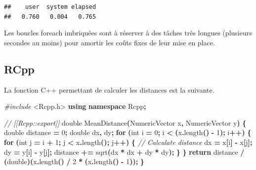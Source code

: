 \documentclass[
  12pt,
  french,
  a4paper,
  extrafontsizes,onecolumn,openright
  ]{memoir}
\newenvironment{Shaded}{\begin{snugshade}}{\end{snugshade}}
\newcommand{\CommentTok}[1]{\textcolor[rgb]{0.56,0.35,0.01}{\textit{#1}}}
\newcommand{\ControlFlowTok}[1]{\textcolor[rgb]{0.13,0.29,0.53}{\textbf{#1}}}
\newcommand{\DataTypeTok}[1]{\textcolor[rgb]{0.13,0.29,0.53}{#1}}
\newcommand{\DecValTok}[1]{\textcolor[rgb]{0.00,0.00,0.81}{#1}}
\newcommand{\ImportTok}[1]{#1}
\newcommand{\KeywordTok}[1]{\textcolor[rgb]{0.13,0.29,0.53}{\textbf{#1}}}
\newcommand{\NormalTok}[1]{#1}
\newcommand{\OperatorTok}[1]{\textcolor[rgb]{0.81,0.36,0.00}{\textbf{#1}}}
\newcommand{\PreprocessorTok}[1]{\textcolor[rgb]{0.56,0.35,0.01}{\textit{#1}}}
\begin{document}
\begin{verbatim}
##    user  system elapsed 
##   0.760   0.004   0.765
\end{verbatim}

\normalsize

Les boucles foreach imbriquées sont à réserver à des tâches très longues (plusieurs secondes au moins) pour amortir les coûts fixes de leur mise en place.

\subsection{RCpp}\label{rcpp}

La fonction C++ permettant de calculer les distances est la suivante.

\scriptsize

\begin{Shaded}
\begin{Highlighting}[]
\PreprocessorTok{\#include }\ImportTok{\textless{}Rcpp.h\textgreater{}}
\KeywordTok{using} \KeywordTok{namespace}\NormalTok{ Rcpp}\OperatorTok{;}

\CommentTok{// [[Rcpp::export]]}
\DataTypeTok{double}\NormalTok{ MeanDistance}\OperatorTok{(}\NormalTok{NumericVector x}\OperatorTok{,}\NormalTok{ NumericVector y}\OperatorTok{)} \OperatorTok{\{}
  \DataTypeTok{double}\NormalTok{ distance }\OperatorTok{=} \DecValTok{0}\OperatorTok{;}
  \DataTypeTok{double}\NormalTok{ dx}\OperatorTok{,}\NormalTok{ dy}\OperatorTok{;}
  \ControlFlowTok{for} \OperatorTok{(}\DataTypeTok{int}\NormalTok{ i }\OperatorTok{=} \DecValTok{0}\OperatorTok{;}\NormalTok{ i }\OperatorTok{\textless{}} \OperatorTok{(}\NormalTok{x}\OperatorTok{.}\NormalTok{length}\OperatorTok{()} \OperatorTok{{-}} \DecValTok{1}\OperatorTok{);}\NormalTok{ i}\OperatorTok{++)} \OperatorTok{\{}
    \ControlFlowTok{for} \OperatorTok{(}\DataTypeTok{int}\NormalTok{ j }\OperatorTok{=}\NormalTok{ i }\OperatorTok{+} \DecValTok{1}\OperatorTok{;}\NormalTok{ j }\OperatorTok{\textless{}}\NormalTok{ x}\OperatorTok{.}\NormalTok{length}\OperatorTok{();}\NormalTok{ j}\OperatorTok{++)} \OperatorTok{\{}
    \CommentTok{// Calculate distance}
\NormalTok{        dx }\OperatorTok{=}\NormalTok{ x}\OperatorTok{[}\NormalTok{i}\OperatorTok{]} \OperatorTok{{-}}\NormalTok{ x}\OperatorTok{[}\NormalTok{j}\OperatorTok{];}
\NormalTok{        dy }\OperatorTok{=}\NormalTok{ y}\OperatorTok{[}\NormalTok{i}\OperatorTok{]} \OperatorTok{{-}}\NormalTok{ y}\OperatorTok{[}\NormalTok{j}\OperatorTok{];}
\NormalTok{        distance }\OperatorTok{+=}\NormalTok{ sqrt}\OperatorTok{(}\NormalTok{dx }\OperatorTok{*}\NormalTok{ dx }\OperatorTok{+}\NormalTok{ dy }\OperatorTok{*}\NormalTok{ dy}\OperatorTok{);}
    \OperatorTok{\}}
  \OperatorTok{\}}
  \ControlFlowTok{return}\NormalTok{ distance }\OperatorTok{/} \OperatorTok{(}\DataTypeTok{double}\OperatorTok{)(}\NormalTok{x}\OperatorTok{.}\NormalTok{length}\OperatorTok{()} \OperatorTok{/} \DecValTok{2} \OperatorTok{*} \OperatorTok{(}\NormalTok{x}\OperatorTok{.}\NormalTok{length}\OperatorTok{()} \OperatorTok{{-}} \DecValTok{1}\OperatorTok{));}
\OperatorTok{\}}
\end{Highlighting}
\end{Shaded}
\end{document}
